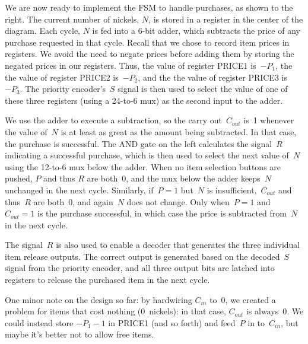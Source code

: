 \begin{minipage}{3.15in}
We are now ready to implement the FSM to handle purchases, as shown to the 
right.  The current number of nickels, $N$, is stored in a register in the
center of the diagram.  Each cycle, $N$ is fed into a \mbox{6-bit} adder,
which subtracts the price of any purchase requested in that cycle. 
%
Recall that we chose to record item prices in registers.  We avoid the 
need to negate prices before adding them by storing the negated prices in
our registers.  Thus, the value of register PRICE1 is~$-P_1$, the
the value of register PRICE2 is~$-P_2$, and the
the value of register PRICE3 is~$-P_3$.
%
The priority encoder's~$S$ signal is then used to select the value of 
one of these three registers (using a \mbox{24-to-6} mux) as the second
input to the adder.\mpline

We use the adder to execute a subtraction, so the carry out~$C_{out}$ 
is~1 whenever the value of~$N$ is at least as great as the amount 
being subtracted.  In that case, the purchase is successful.  The AND
gate on the left calculates the signal~$R$ indicating a successful purchase,
which is then used to select the next value of~$N$ using the \mbox{12-to-6}
mux below the adder.  
%
When no item selection buttons are pushed, $P$ and thus $R$ are both~0, 
and the mux below the adder keeps~$N$ unchanged in the next cycle.  
Similarly, if~$P=1$ but~$N$ is
insufficient,~$C_{out}$ and thus~$R$ are both~0, and again~$N$ does
not change.  Only when~$P=1$ and~$C_{out}=1$ is the purchase successful,
in which case the price is subtracted from~$N$ in the next cycle.
\end{minipage}\hspace{0.25in}%
\begin{minipage}{3.1in}
\vspace{12pt}
\end{minipage}

The signal~$R$ is also used to enable a decoder that generates the three
individual item release outputs.  The correct output is generated based on
the decoded~$S$ signal from the priority encoder, and all three output
bits are latched into registers to release the purchased item in the next 
cycle.

One minor note on the design so far: by hardwiring $C_{in}$ to~0, we created 
a problem for items that cost nothing (0~nickels): in that case, $C_{out}$ is
always~0.  We could instead store
$-P_1-1$ in PRICE1 (and so forth) and feed~$P$ in to~$C_{in}$, but maybe
it's better not to allow free items.

